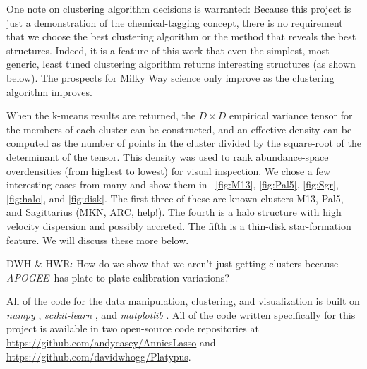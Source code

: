 \documentclass[12pt, letterpaper, preprint]{aastex}
\newcommand{\acronym}[1]{{\small{#1}}}
\newcommand{\project}[1]{\textsl{#1}}
\newcommand{\apogee}{\project{\acronym{APOGEE}}}
\begin{document}
One note on clustering algorithm decisions is warranted:
Because this project is just a demonstration of the chemical-tagging
concept, there is no requirement that we choose the best clustering
algorithm or the method that reveals the best structures.
Indeed, it is a feature of this work that even the simplest, most
generic, least tuned clustering algorithm returns interesting
structures (as shown below).
The prospects for Milky Way science only improve as the clustering
algorithm improves.

When the k-means results are returned, the $D\times D$ empirical
variance tensor for the members of each cluster can be constructed,
and an effective density can be computed as the number of points in
the cluster divided by the square-root of the determinant of the
tensor.
This density was used to rank abundance-space overdensities (from highest
to lowest) for visual inspection.
We chose a few interesting cases from many and show them in
\figurename~\ref{fig:M13}, \ref{fig:Pal5}, \ref{fig:Sgr},
\ref{fig:halo}, and \ref{fig:disk}.
The first three of these are known clusters M13, Pal5, and Sagittarius (MKN, ARC, help!).
The fourth is a halo structure with high velocity dispersion and possibly accreted.
The fifth is a thin-disk star-formation feature.
We will discuss these more below.

DWH \& HWR: How do we show that we aren't just getting clusters because \apogee\ has plate-to-plate calibration variations?

All of the code for the data manipulation, clustering, and
visualization is built on \project{numpy} \citep{numpy},
\project{scikit-learn} \citep{sklearn}, and \project{matplotlib}
\citep{matplotlib}.
All of the code written specifically for this project is available in
two open-source code repositories at
\url{https://github.com/andycasey/AnniesLasso} and
\url{https://github.com/davidwhogg/Platypus}.
\end{document}
